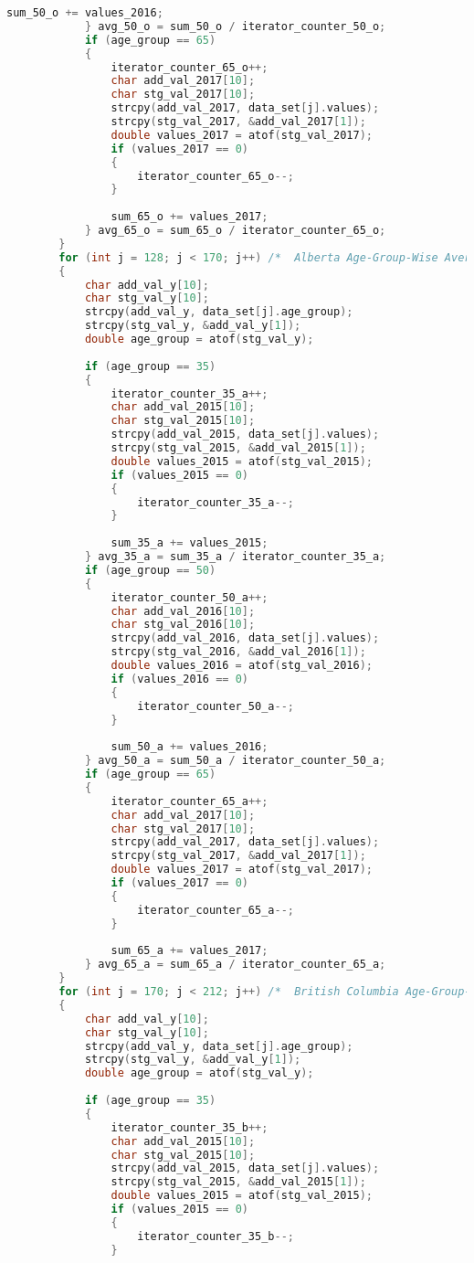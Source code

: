 \begin{lstlisting}[language=C, caption=\textit{CPS 188 Term Project Source Code}]
				sum_50_o += values_2016;
			} avg_50_o = sum_50_o / iterator_counter_50_o;
			if (age_group == 65)
			{
				iterator_counter_65_o++;
				char add_val_2017[10];
				char stg_val_2017[10];
				strcpy(add_val_2017, data_set[j].values);
				strcpy(stg_val_2017, &add_val_2017[1]);
				double values_2017 = atof(stg_val_2017);
				if (values_2017 == 0)
				{
					iterator_counter_65_o--;
				}
				
				sum_65_o += values_2017;
			} avg_65_o = sum_65_o / iterator_counter_65_o;
		}
		for (int j = 128; j < 170; j++)	/*	Alberta Age-Group-Wise Average Calculator	*/
		{
			char add_val_y[10];
			char stg_val_y[10];
			strcpy(add_val_y, data_set[j].age_group);
			strcpy(stg_val_y, &add_val_y[1]);
			double age_group = atof(stg_val_y);
			
			if (age_group == 35)
			{
				iterator_counter_35_a++;
				char add_val_2015[10];
				char stg_val_2015[10];
				strcpy(add_val_2015, data_set[j].values);
				strcpy(stg_val_2015, &add_val_2015[1]);
				double values_2015 = atof(stg_val_2015);
				if (values_2015 == 0)
				{
					iterator_counter_35_a--;
				}
				
				sum_35_a += values_2015;
			} avg_35_a = sum_35_a / iterator_counter_35_a;
			if (age_group == 50)
			{
				iterator_counter_50_a++;
				char add_val_2016[10];
				char stg_val_2016[10];
				strcpy(add_val_2016, data_set[j].values);
				strcpy(stg_val_2016, &add_val_2016[1]);
				double values_2016 = atof(stg_val_2016);
				if (values_2016 == 0)
				{
					iterator_counter_50_a--;
				}
				
				sum_50_a += values_2016;
			} avg_50_a = sum_50_a / iterator_counter_50_a;
			if (age_group == 65)
			{
				iterator_counter_65_a++;
				char add_val_2017[10];
				char stg_val_2017[10];
				strcpy(add_val_2017, data_set[j].values);
				strcpy(stg_val_2017, &add_val_2017[1]);
				double values_2017 = atof(stg_val_2017);
				if (values_2017 == 0)
				{
					iterator_counter_65_a--;
				}
				
				sum_65_a += values_2017;
			} avg_65_a = sum_65_a / iterator_counter_65_a;
		}
		for (int j = 170; j < 212; j++)	/*	British Columbia Age-Group-Wise Average Calculator	*/
		{
			char add_val_y[10];
			char stg_val_y[10];
			strcpy(add_val_y, data_set[j].age_group);
			strcpy(stg_val_y, &add_val_y[1]);
			double age_group = atof(stg_val_y);
			
			if (age_group == 35)
			{
				iterator_counter_35_b++;
				char add_val_2015[10];
				char stg_val_2015[10];
				strcpy(add_val_2015, data_set[j].values);
				strcpy(stg_val_2015, &add_val_2015[1]);
				double values_2015 = atof(stg_val_2015);
				if (values_2015 == 0)
				{
					iterator_counter_35_b--;
				}
				

\end{lstlisting}
